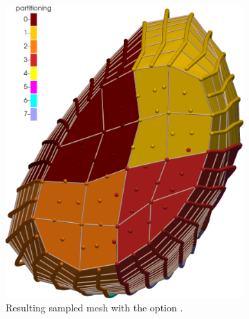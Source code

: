 \begin{figure}%
  \centering%
  \begin{subfigure}[t]{0.48\textwidth}%
    \centering%
    \includegraphics[width=\textwidth]{images/implementation/partitioning4.png}
    \caption{Resulting sampled mesh with the option .}%
    \label{fig:partitioning4}%
  \end{subfigure}
  \quad
  \begin{subfigure}[t]{0.48\textwidth}%
    \centering%

\end{subfigure}
\end{figure}
